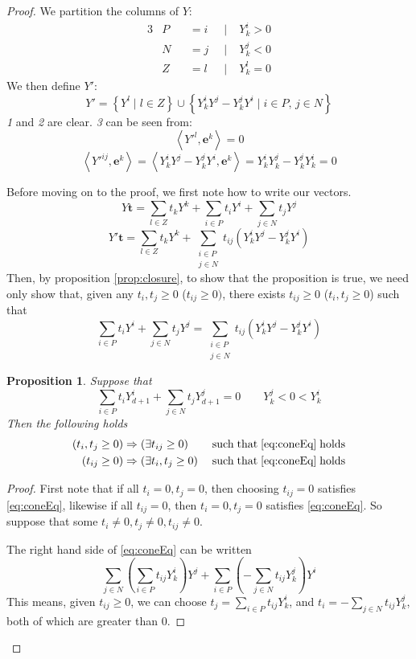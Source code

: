 \documentclass[fleqn]{article}
\renewcommand{\vec}[1]{\mathbf{#1}}
\newcommand{\set}[1]{\left\{#1\right\}}
\newcommand{\ip}[2]{\left\langle #1, #2 \right\rangle}
\newcommand{\0}{\vec{0}}
\newcommand{\e}{\vec{e}}
\renewcommand{\t}{\vec{t}}
\newcommand{\st}{\;|\;}
\newcommand{\Yi}{Y^i_{k}}
\newcommand{\Yj}{Y^j_{k}}
\newcommand{\Yl}{Y^l_{k}}
\newcommand{\Psum}{\sum_{i\in P}}
\newcommand{\Nsum}{\sum_{j\in N}}
\newcommand{\Zsum}{\sum_{l\in Z}}
\newcommand{\NPsum}{\sum_{\substack{i\in P \\ j\in N}}}
\newtheorem{Prop}{Proposition}
\begin{document}
\begin{proof}
We partition the columns of $ Y$:
  \begin{alignat*}{3}
  &P &&= i \;&\st &\Yi > 0 \\
  &N &&= j \;&\st &\Yj < 0 \\
  &Z &&= l \;&\st &\Yl = 0
  \end{alignat*}
We then define $ Y'$:
\[  Y' = \set{ Y^l \st l \in Z} \cup 
          \set{\Yi Y^j - \Yj Y^i \st i \in P,\, j\in N} \]
\textit{1} and \textit{2} are clear.  \textit{3} can be seen from:
  \[ \ip{Y'^l}{\e^k} = 0 \]
  \begin{equation}\label{eq:vdropZrows}
  \ip{Y'^{ij}}{\e^k} = \ip{\Yi Y^j - \Yj Y^i}{\e^k} = \Yi \Yj - \Yj \Yi = 0
  \end{equation}

Before moving on to the proof, we first note how to write our vectors.
\[  Y\t = \Zsum t_k  Y^k + \Psum t_i  Y^i + \Nsum t_j  Y^j \]
\[  Y'\t = \Zsum t_k  Y^k + \NPsum t_{ij} (\Yi Y^j - \Yj Y^i) \]
Then, by proposition \ref{prop:closure}, to show that the proposition is true, we need only show that, given any $t_i, t_j \geq 0$ ($t_{ij} \geq 0)$, there exists $t_{ij} \geq 0$ ($t_i, t_j \geq 0$) such that
\begin{equation} \label{eq:coneEq}
  \Psum t_i  Y^i + \Nsum t_j  Y^j = \NPsum t_{ij} (\Yi Y^j - \Yj Y^i)
\end{equation}
\begin{Prop}{
  Suppose that 
  \[ \Psum t_i  Y^i_{d+1} + \Nsum t_j  Y^j_{d+1} = 0\quad\quad \Yj < 0 < \Yi \]
  Then the following holds
\begin{alignat*}{2} 
(t_i, t_j \geq 0)& \Rightarrow (\exists t_{ij} \geq 0)
                       && \mathrm{\;such\; that\; \eqref{eq:coneEq}\; holds}  \\
(t_{ij} \geq 0)& \Rightarrow (\exists t_i, t_j \geq 0)
                       && \mathrm{\;such\; that\; \eqref{eq:coneEq}\; holds}
\end{alignat*}
}\end{Prop}
\begin{proof}
First note that if all $t_i = 0,t_j = 0$, then choosing $t_{ij} = 0$ satisfies \eqref{eq:coneEq}, likewise if all $t_{ij} = 0$, then $t_i = 0, t_j = 0$ satisfies \eqref{eq:coneEq}.  So suppose that some $t_i \neq 0, t_j \neq 0, t_{ij} \neq 0$.

The right hand side of \eqref{eq:coneEq} can be written
\[ \Nsum \left(\Psum t_{ij}\Yi\right) Y^j + 
   \Psum \left(-\Nsum t_{ij}\Yj\right) Y^i \]
This means, given $t_{ij} \geq 0$, we can choose $t_j = \Psum t_{ij}\Yi$, and $t_i = -\Nsum t_{ij}\Yj$, both of which are greater than $0$.


\end{proof}
\end{proof}
\end{document}
